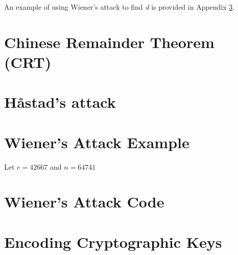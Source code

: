 \documentclass[11pt]{article}
\begin{document}
An example of using Wiener's attack to find \emph{d} is provided in Appendix \ref{appendix:example}.

\section{Chinese Remainder Theorem (CRT)} \label{CRT}

\section{Håstad's attack}
\medskip




\begin{appendices}
\section{Wiener's Attack Example}
\label{appendix:example}
Let $ e = 42667 $ and $ n = 64741 $
\section{Wiener's Attack Code}
\section{Encoding Cryptographic Keys}
\label{appendix:pem}
\end{appendices}
\end{document}
